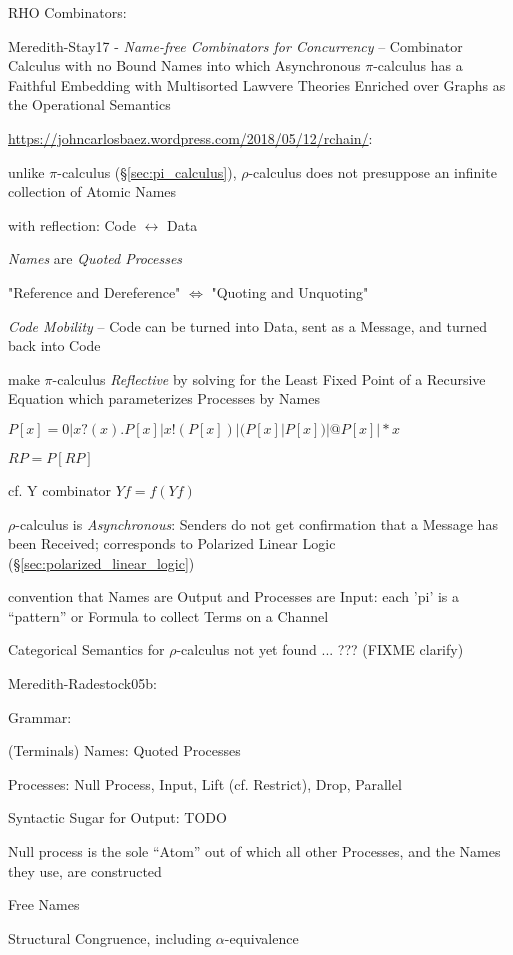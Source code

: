 RHO Combinators:

Meredith-Stay17 - \emph{Name-free Combinators for Concurrency} --
Combinator Calculus with no Bound Names into which Asynchronous
$\pi$-calculus has a Faithful Embedding with Multisorted Lawvere
Theories Enriched over Graphs as the Operational Semantics

\url{https://johncarlosbaez.wordpress.com/2018/05/12/rchain/}:

unlike $\pi$-calculus (\S\ref{sec:pi_calculus}), $\rho$-calculus does not
presuppose an infinite collection of Atomic Names

with reflection: Code $\leftrightarrow$ Data

\emph{Names} are \emph{Quoted Processes}

"Reference and Dereference" $\Leftrightarrow$ "Quoting and Unquoting"

\emph{Code Mobility} -- Code can be turned into Data, sent as a Message, and
turned back into Code

make $\pi$-calculus \emph{Reflective} by solving for the Least Fixed Point of a
Recursive Equation which parameterizes Processes by Names

$P[x] = 0 | x?(x).P[x] | x!(P[x]) | (P[x]|P[x]) | @P[x] | *x$

$RP = P[RP]$

cf. Y combinator $Yf = f(Yf)$

$\rho$-calculus is \emph{Asynchronous}: Senders do not get confirmation that a
Message has been Received; corresponds to Polarized Linear Logic
(\S\ref{sec:polarized_linear_logic})

convention that Names are Output and Processes are Input: each 'pi' is a
``pattern'' or Formula to collect Terms on a Channel

Categorical Semantics for $\rho$-calculus not yet found ... ??? (FIXME clarify)

Meredith-Radestock05b:

Grammar:

(Terminals) Names: Quoted Processes

Processes: Null Process, Input, Lift (cf. Restrict), Drop, Parallel

Syntactic Sugar for Output: TODO

Null process is the sole ``Atom'' out of which all other Processes, and the
Names they use, are constructed

Free Names

Structural Congruence, including $\alpha$-equivalence

